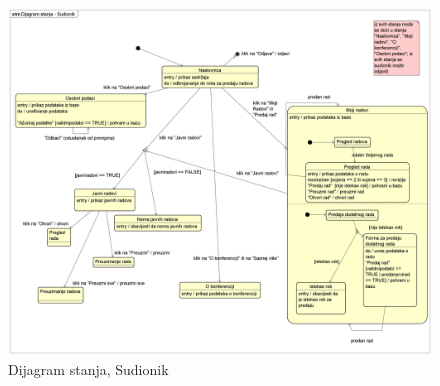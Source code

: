 			\begin{figure}[H]
				\includegraphics[width= 15 cm, height= 25 cm, keepaspectratio]{dijagrami/Dijagram stanja - Sudionik.png} 
				\centering
				\caption{Dijagram stanja, Sudionik}
				\label{fig:stanje1}
			\end{figure}
		
